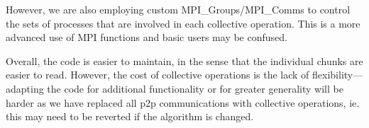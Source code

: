 	However, we are also employing custom MPI_Groups/MPI_Comms to control the sets of processes that are involved in each collective operation. This is a more advanced use of MPI functions and basic users may be confused. 
	
	Overall, the code is easier to maintain, in the sense that the individual chunks are easier to read. However, the cost of collective operations is the lack of flexibility---adapting the code for additional functionality or for greater generality will be harder as we have replaced all p2p communications with collective operations, ie. this may need to be reverted if the algorithm is changed.




